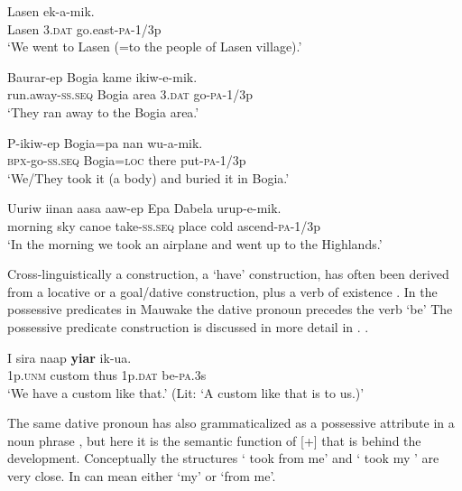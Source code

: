 \ea%
\label{ex:3:x586}
\gll Lasen  ek-a-mik. \\
Lasen 3.\textsc{dat} go.east-\textsc{pa}-1/3p\\
\glt`We went to Lasen (=to the people of Lasen village).'
\z

\ea%
\label{ex:3:x587}
\gll Baurar-ep Bogia kame  ikiw-e-mik. \\
run.away-\textsc{ss}.\textsc{seq} Bogia area 3.\textsc{dat} go-\textsc{pa}-1/3p\\
\glt`They ran away to the Bogia area.'
\z

\ea%
\label{ex:3:x1802}
\gll P-ikiw-ep Bogia=pa nan wu-a-mik. \\
\textsc{bpx}-go-\textsc{ss}.\textsc{seq} Bogia=\textsc{loc} there put-\textsc{pa}-1/3p\\
\glt`We/They took it (a body) and buried it in Bogia.'
\z

\ea%
\label{ex:3:x1800}
\gll Uuriw iinan aasa aaw-ep Epa Dabela urup-e-mik. \\
morning sky canoe take-\textsc{ss}.\textsc{seq} place cold ascend-\textsc{pa}-1/3p\\
\glt`In the morning we took an airplane and went up to the Highlands.'
\z

Cross-linguistically a  construction, a `have' construction, has often been derived from a locative or a goal/dative construction, plus a verb of existence \citep[50--61]{Heine1997}. In the possessive predicates in Mauwake the dative pronoun precedes the verb \textstyleStyleVernacularWordsItalic{-} `be'  The possessive predicate construction is discussed in more detail in . . 

\ea%
\label{ex:3:x1788}
\gll I sira naap \textbf{yiar} ik-ua. \\
1p.\textsc{unm} custom thus 1p.\textsc{dat} be-\textsc{pa}.3s\\
\glt`We have a custom like that.' (Lit: `A custom like that is to us.)'
\z

The same dative pronoun has also grammaticalized as a possessive attribute in a noun phrase , but here it is the semantic function of [+]  that is behind the development. Conceptually the structures ` took  from me' and ` took my ' are very close. In   can mean either `my' or `from me'. 

